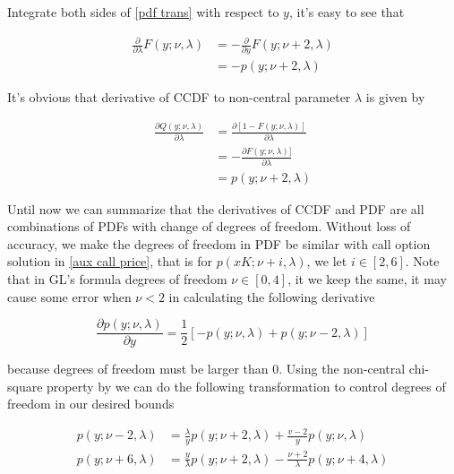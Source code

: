 \noindent Integrate both sides of \eqref{pdf trans} with respect to $y$, it's easy to see that

\begin{equation}
    \begin{aligned}
        \frac{\partial}{\partial \lambda} F(y;\nu,\lambda)&=-\frac{\partial}{\partial y}F(y;\nu+2,\lambda) \\
        &= -p(y;\nu+2,\lambda)
    \end{aligned}
\end{equation}

\noindent It's obvious that derivative of CCDF to non-central parameter $\lambda$ is given by

\begin{equation}\label{CCDF2lambda}
    \begin{aligned}
        \frac{\partial Q(y; \nu, \lambda)}{\partial \lambda}&=\frac{\partial[1-F(y; \nu, \lambda)]}{\partial \lambda} \\ 
        &=-\frac{\partial F(y; \nu, \lambda)]}{\partial \lambda}\\
        &= p(y;\nu+2,\lambda)
    \end{aligned}
\end{equation}

Until now we can summarize that the derivatives of CCDF and PDF are all combinations of PDFs with change of degrees of freedom. Without loss of accuracy, we make the degrees of freedom in PDF be similar with call option solution in \eqref{aux call price}, that is for $p(xK;\nu+i, \lambda)$, we let $i \in [2,6]$. Note that in GL's formula degrees of freedom $\nu \in [0,4]$, it we keep the same, it may cause some error when $\nu<2$ in calculating the following derivative

$$
\frac{\partial p(y;\nu,\lambda)}{\partial y}=\frac{1}{2}[-p(y ; \nu, \lambda)+p(y ; \nu-2, \lambda)]
$$

\noindent because degrees of freedom must be larger than 0. Using the non-central chi-square property by \cite{cohen_noncentral_1988} we can do the following transformation to control degrees of freedom in our desired bounds

\begin{equation}\label{trans}
    \begin{aligned}
        p(y ; \nu-2, \lambda)&=\frac{\lambda}{y} p(y ; \nu+2, \lambda)+\frac{v-2}{y} p(y ; \nu, \lambda) \\
        p(y ; \nu+6, \lambda)&=\frac{y}{\lambda} p(y ; \nu+2, \lambda)-\frac{\nu+2}{\lambda} p(y ; \nu+4, \lambda)
    \end{aligned}
\end{equation}

